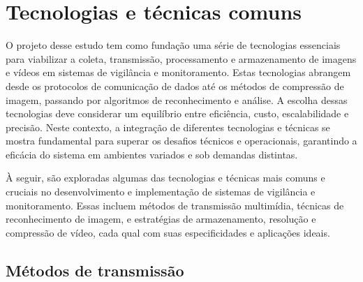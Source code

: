 \documentclass[12pt, %
openright, 
oneside, %
a4paper,    %
brazil]{facom-ufu-abntex2}
\begin{document}
\section{Tecnologias e técnicas comuns}

O projeto desse estudo tem como fundação uma série de tecnologias essenciais
para viabilizar a coleta, transmissão, processamento e armazenamento de imagens
e vídeos em sistemas de vigilância e monitoramento. Estas tecnologias abrangem
desde os protocolos de comunicação de dados até os métodos de compressão de
imagem, passando por algoritmos de reconhecimento e análise. A escolha dessas
tecnologias deve considerar um equilíbrio entre eficiência, custo,
escalabilidade e precisão. Neste contexto, a integração de diferentes
tecnologias e técnicas se mostra fundamental para superar os desafios técnicos
e operacionais, garantindo a eficácia do sistema em ambientes variados e sob
demandas distintas.

À seguir, são exploradas algumas das tecnologias e técnicas mais comuns e
cruciais no desenvolvimento e implementação de sistemas de vigilância e
monitoramento. Essas incluem métodos de transmissão multimídia, técnicas de
reconhecimento de imagem, e estratégias de armazenamento, resolução e
compressão de vídeo, cada qual com suas especificidades e aplicações ideais.

\subsection{Métodos de transmissão}
\end{document}
